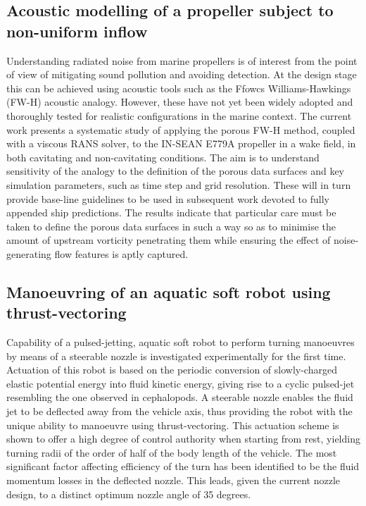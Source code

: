\documentclass[a4paper,10pt]{article}
\begin{document}
\subsection{Acoustic modelling of a propeller subject to non-uniform inflow \cite{Lidtke2019a}}

	Understanding radiated noise from marine propellers is of interest from the point of view of mitigating sound pollution and avoiding detection. At the design stage this can be achieved using acoustic tools such as the Ffowcs Williams-Hawkings (FW-H) acoustic analogy. However, these have not yet been widely adopted and thoroughly tested for realistic configurations in the marine context. The current work presents a systematic study of applying the porous FW-H method, coupled with a viscous RANS solver, to the IN-SEAN E779A propeller in a wake field, in both cavitating and non-cavitating conditions. The aim is to understand sensitivity of the analogy to the definition of the porous data surfaces and key simulation parameters, such as time step and grid resolution. These will in turn provide base-line guidelines to be used in subsequent work devoted to fully appended ship predictions. The results indicate that particular care must be taken to define the porous data surfaces in such a way so as to minimise the amount of upstream vorticity penetrating them while ensuring the effect of noise-generating flow features is aptly captured.

\subsection{Manoeuvring of an aquatic soft robot using thrust-vectoring \cite{Wang2019}}

	Capability of a pulsed-jetting, aquatic soft robot to perform turning manoeuvres by means of a steerable nozzle is investigated experimentally for the first time. Actuation of this robot is based on the periodic conversion of slowly-charged elastic potential energy into fluid kinetic energy, giving rise to a cyclic pulsed-jet resembling the one observed in cephalopods. A steerable nozzle enables the fluid jet to be deflected away from the vehicle axis, thus providing the robot with the unique ability to manoeuvre using thrust-vectoring. This actuation scheme is shown to offer a high degree of control authority when starting from rest, yielding turning radii of the order of half of the body length of the vehicle. The most significant factor affecting efficiency of the turn has been identified to be the fluid momentum losses in the deflected nozzle. This leads, given the current nozzle design, to a distinct optimum nozzle angle of 35 degrees.
\end{document}
